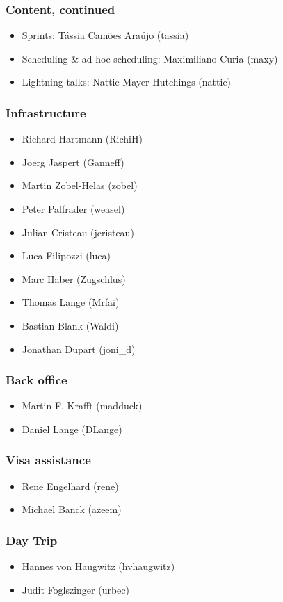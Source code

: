\documentclass[t]{beamer}
\begin{document}
\begin{frame}
	\frametitle{Content, continued}
	\begin{itemize}
		\item Sprints: Tássia Camões Araújo (tassia)
		\item Scheduling \& ad-hoc scheduling: Maximiliano Curia (maxy)
		\item Lightning talks: Nattie Mayer-Hutchings (nattie)
	\end{itemize}
\end{frame}

\begin{frame}
	\frametitle{Infrastructure}
	\begin{itemize}
		\item Richard Hartmann (RichiH)
		\item Joerg Jaspert (Ganneff)
		\item Martin Zobel-Helas (zobel)
		\item Peter Palfrader (weasel)
		\item Julian Cristeau (jcristeau)
		\item Luca Filipozzi (luca)
		\item Marc Haber (Zugschlus)
		\item Thomas Lange (Mrfai)
		\item Bastian Blank (Waldi)
		\item Jonathan Dupart (joni\_d)
	\end{itemize}
\end{frame}

\begin{frame}
	\frametitle{Back office}
	\begin{itemize}
		\item Martin F. Krafft (madduck)
		\item Daniel Lange (DLange)
	\end{itemize}
\end{frame}

\begin{frame}
	\frametitle{Visa assistance}
	\begin{itemize}
		\item Rene Engelhard (rene)
		\item Michael Banck (azeem)
	\end{itemize}
\end{frame}

\begin{frame}
	\frametitle{Day Trip}
	\begin{itemize}
		\item Hannes von Haugwitz (hvhaugwitz)
		\item Judit Foglszinger (urbec)
	\end{itemize}
\end{frame}
\end{document}

